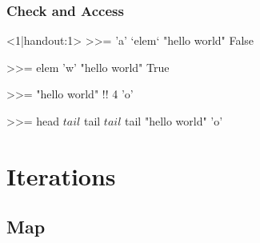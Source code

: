 \begin{frame}[t,fragile]
    \frametitle{Check and Access}
    \begin{hscode}<1|handout:1>
        >>= 'a' `elem` "hello world"
        False

        >>= elem 'w' "hello world"
        True

        >>= "hello world" !! 4
        'o'

        >>= head $ tail $ tail $ tail $ tail "hello world"
        'o'
    \end{hscode}
\end{frame}

\section{Iterations}
\subsection{Map}
